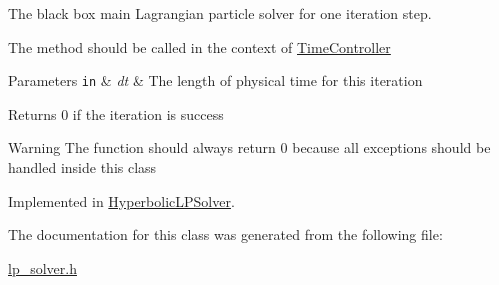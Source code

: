 The black box main Lagrangian particle solver for one iteration step. 

The method should be called in the context of \hyperlink{classTimeController}{Time\-Controller}


\begin{DoxyParams}[1]{Parameters}
\mbox{\tt in}  & {\em dt} & The length of physical time for this iteration \\
\hline
\end{DoxyParams}
\begin{DoxyReturn}{Returns}
0 if the iteration is success 
\end{DoxyReturn}
\begin{DoxyWarning}{Warning}
The function should always return 0 because all exceptions should be handled inside this class 
\end{DoxyWarning}


Implemented in \hyperlink{classHyperbolicLPSolver_a8f8cbda5f22f052208cdc4d4d03dc567}{Hyperbolic\-L\-P\-Solver}.



The documentation for this class was generated from the following file\-:\begin{DoxyCompactItemize}
\item 
\hyperlink{lp__solver_8h}{lp\-\_\-solver.\-h}\end{DoxyCompactItemize}
